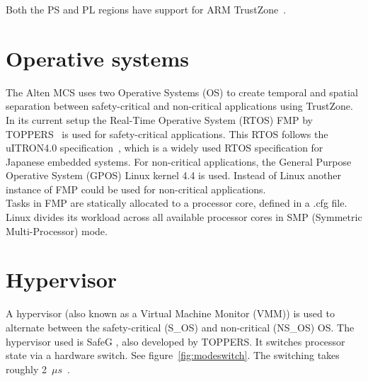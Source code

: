 Both the PS and PL regions have support for ARM TrustZone~\cite{website:ARM}.\\

\section{Operative systems}
The Alten MCS uses two Operative Systems (OS) to create temporal and spatial separation between safety-critical and non-critical applications using TrustZone. In its current setup the Real-Time Operative System (RTOS) FMP by TOPPERS~\cite{website:fmp} is used for safety-critical applications. This RTOS follows the uITRON4.0 specification~\cite{uitron}, which is a widely used RTOS specification for Japanese embedded systems. For non-critical applications, the General Purpose Operative System (GPOS) Linux kernel 4.4 is used. Instead of Linux another instance of FMP could be used for non-critical applications.\\

Tasks in FMP are statically allocated to a processor core, defined in a .cfg file. Linux divides its workload across all available processor cores in SMP (Symmetric Multi-Processor) mode.

\section{Hypervisor}

A hypervisor (also known as a Virtual Machine Monitor (VMM)) is used to alternate between the safety-critical (S\_OS) and non-critical (NS\_OS) OS. The hypervisor used is SafeG \cite{website:safeg}, also developed by TOPPERS. It switches processor state via a hardware switch. See figure~\ref{fig:modeswitch}. The switching takes roughly 2~$\mu s$~\cite{safegswitch}.

